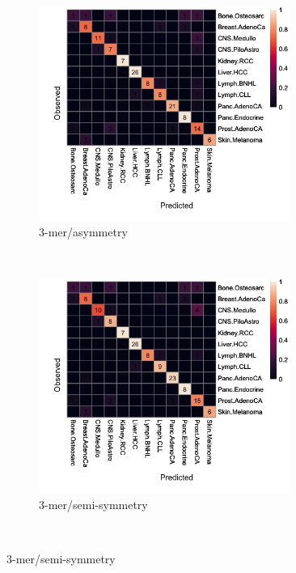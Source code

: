 \begin{figure}[ht!]
    \begin{subfigure}{.5\textwidth}
    \centering
    \includegraphics[width=0.9\textwidth,height=0.8\textwidth]{graphics/confusion_matrix_3mer.png}
    \caption{3-mer/asymmetry}
    \label{fig:confusion_3mer}
    \end{subfigure}
    ~
    \begin{subfigure}{.5\textwidth}
    \centering
    \includegraphics[width=0.9\textwidth,height=0.8\textwidth]{graphics/confusion_matrix_symmetric_3mer.png}
    \caption{3-mer/semi-symmetry}
    \label{fig:confusion_3mer_symmetric}
    \end{subfigure} \\
    \vspace{0.1cm}
    

\end{figure}
